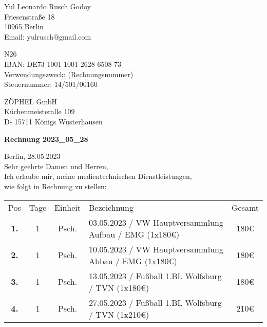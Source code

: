 \documentclass[12pt]{article}
\begin{document}

\begin{flushright}

Yul Leonardo Rusch Godoy\\
Friesenstraße 18\\
10965 Berlin\\
Email: yulrusch@gmail.com\\

\vspace{0.5cm}

N26\\
IBAN: DE73 1001 1001 2628 6508 73\\
Verwendungszweck: (Rechnungsnummer)\\
Steuernummer: 14/501/00160\\

\end{flushright}

\vspace{0.5cm}

\begin{flushleft}

ZÖPHEL GmbH\\
Küchenmeisteralle 109\\
D- 15711 Königs Wusterhausen\\

\vspace{2cm}

\textbf{Rechnung 2023\_05\_28\\}

\vspace{0.5cm}

Berlin, 28.05.2023\\
Sehr geehrte Damen und Herren,\\
Ich erlaube mir, meine medientechnischen Dienstleistungen,\\
wie folgt in Rechnung zu stellen:\\

\end{flushleft}

\begin{flushleft}
\begin{tabular}{c c c p{9.7cm} c}
Pos & Tage & Einheit & Bezeichnung & Gesamt\\ 
\rowcolor{lightgrey}
\textbf{1.} & 1 & Psch. & 03.05.2023 / VW Hauptversammlung Aufbau / EMG (1x180€) & 180€ \\ 
\textbf{2.} & 1 & Psch. & 10.05.2023 / VW Hauptversammlung Abbau / EMG (1x180€) & 180€\\ 
\rowcolor{lightgrey}
\textbf{3.} & 1 & Psch. & 13.05.2023 / Fußball 1.BL Wolfsburg / TVN (1x180€) & 180€\\ 
\textbf{4.} & 1 & Psch. & 27.05.2023 / Fußball 1.BL Wolfsburg / TVN (1x210€)& 210€\\ 
\end{tabular}        
\end{flushleft}
\end{document}

